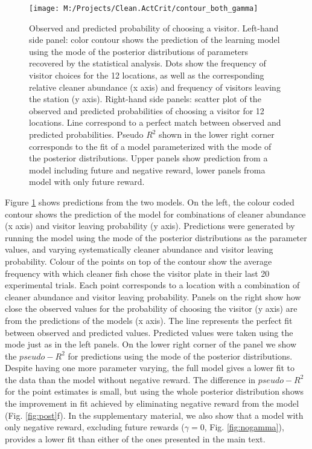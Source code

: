 \documentclass[]{rsos}%
\begin{document}
\begin{figure}

{\centering \texttt{[image: M:/Projects/Clean.ActCrit/contour\_both\_gamma]} 

}

\caption{Observed and predicted probability of choosing a visitor. Left-hand side panel: color contour shows the prediction of the learning model using the mode of the posterior distributions of parameters recovered by the statistical analysis. Dots show the frequency of visitor choices for the 12 locations, as well as the corresponding relative cleaner abundance (x axis) and frequency of visitors leaving the station (y axis). Right-hand side panels: scatter plot of the observed and predicted probabilities of choosing a visitor for 12 locations. Line correspond to a perfect match between observed and predicted probabilities. Pseudo $R^2$ shown in the lower right corner corresponds to the fit of a model parameterized with the mode of the posterior distributions. Upper panels show prediction from a model including future and negative reward, lower panels froma  model with only future reward.}\label{fig:pred}
\end{figure}

Figure \ref{fig:pred} shows predictions from the two models. On the
left, the colour coded contour shows the prediction of the model for
combinations of cleaner abundance (x axis) and visitor leaving
probability (y axis). Predictions were generated by running the model
using the mode of the posterior distributions as the parameter values,
and varying systematically cleaner abundance and visitor leaving
probability. Colour of the points on top of the contour show the average
frequency with which cleaner fish chose the visitor plate in their last
20 experimental trials. Each point corresponds to a location with a
combination of cleaner abundance and visitor leaving probability. Panels
on the right show how close the observed values for the probability of
choosing the visitor (y axis) are from the predictions of the models (x
axis). The line represents the perfect fit between observed and
predicted values. Predicted values were taken using the mode just as in
the left panels. On the lower right corner of the panel we show the
\(pseudo-R^2\) for predictions using the mode of the posterior
distributions. Despite having one more parameter varying, the full model
gives a lower fit to the data than the model without negative reward.
The difference in \(pseudo-R^2\) for the point estimates is small, but
using the whole posterior distribution shows the improvement in fit
achieved by eliminating negative reward from the model (Fig.
\ref{fig:post}f). In the supplementary material, we also show that a
model with only negative reward, excluding future rewards (\(\gamma=0\),
Fig. \ref{fig:nogamma}), provides a lower fit than either of the ones
presented in the main text.
\end{document}
